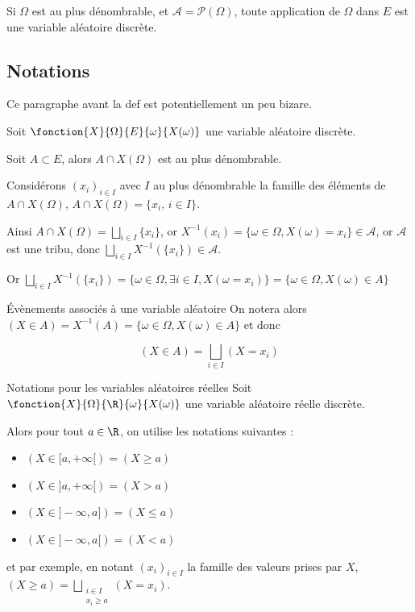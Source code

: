 \begin{remarque}
    Si $\Omega$ est au plus dénombrable, et $\mathcal A = \mathscr P(\Omega)$, toute application 
    de $\Omega$ dans $E$ est une variable aléatoire discrète.
\end{remarque}

\subsection{Notations}

Ce paragraphe avant la def est potentiellement un peu bizare.

Soit $\fonction{X}{\Omega}{E}{\omega}{X(\omega)}$ une variable aléatoire discrète.

Soit $A \subset E$, alors $A \cap X(\Omega)$ est au plus dénombrable. 

Considérons $(x_i)_{i \in I}$ avec $I$ au plus dénombrable la famille des éléments 
de $A \cap X(\Omega)$, $A \cap X(\Omega) = \{x_i, \, i \in I\}$.

Ainsi $A \cap X(\Omega) = \bigsqcup_{i \in I} \{x_i\}$, or 
$X^{-1}({x_i}) = \{\omega \in \Omega, X(\omega) = x_i\} \in \mathcal A$, or $\mathcal A$
est une tribu, donc $\displaystyle \bigsqcup_{i \in I} X^{-1}(\{x_i\}) \in \mathcal A$.

Or $\bigsqcup_{i \in I} X^{-1}(\{x_i\}) = \{\omega \in \Omega, \exists i \in I, X(\omega = x_i)\} = \{\omega \in \Omega, X(\omega) \in A\}$


\begin{definition}{Évènements associés à une variable aléatoire}{}
    On notera alors $(X \in A) = X^{-1}(A) = \{\omega \in \Omega, X(\omega) \in A\}$ et donc 

    $$\displaystyle (X \in A) = \bigsqcup_{i \in I} (X = x_i)$$
    
\end{definition}

\begin{definition}{Notations pour les variables aléatoires réelles}{}
    Soit $\fonction{X}{\Omega}{\R}{\omega}{X(\omega)}$ une variable aléatoire réelle discrète.

    Alors pour tout $a \in \R$, on utilise les notations suivantes : 

    \begin{itemize}
        \item $(X \in [a, + \infty[) = (X \geqslant a)$
        \item $(X \in ]a, + \infty[) = (X > a)$
        \item $(X \in ]-\infty, a]) = (X \leqslant a)$
        \item $(X \in ]-\infty, a[) = (X < a)$
    \end{itemize}

    et par exemple, en notant $(x_i)_{i \in I}$ la famille des valeurs prises par $X$, 
    $\displaystyle (X \geqslant a) = \bigsqcup_{\substack{i \in I \\ x_i \geqslant a}} (X = x_i)$.
\end{definition}

